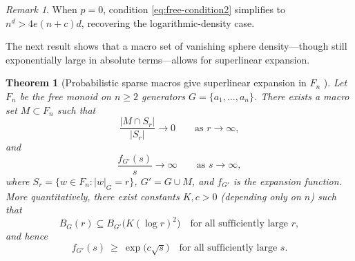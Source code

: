 \documentclass[12pt]{amsart}
\newtheorem{theorem}{Theorem}
\theoremstyle{definition}
\theoremstyle{remark}
\newtheorem{remark}{Remark}
\begin{document}
\begin{remark}
When $p = 0$, condition \eqref{eq:free-condition2} simplifies to $n^d > 4e(n+c)d$, recovering the logarithmic-density case.
\end{remark}

The next result shows that a macro set of vanishing sphere density---though still exponentially large in absolute terms---allows for superlinear expansion.

\begin{theorem}[Probabilistic sparse macros give superlinear expansion in $F_n$ ]
\label{thm:free-probabilistic}
Let $F_n$ be the free monoid on $n\ge 2$ generators $G=\{a_1,\dots,a_n\}$.
There exists a macro set $M\subset F_n$ such that
\[
\frac{|M\cap S_r|}{|S_r|}\longrightarrow 0
\qquad\text{as }r\to\infty,
\]
and
\[
\frac{f_{G'}(s)}{s}\longrightarrow \infty
\qquad\text{as }s\to\infty,
\]
where $S_r=\{w\in F_n:|w|_G=r\}$, $G' = G\cup M$, and $f_{G'}$ is the expansion function.
More quantitatively, there exist constants $K,c>0$ (depending only on $n$) such that
\[
B_G(r)\subseteq B_{G'}\!\bigl(K(\log r)^2\bigr)
\quad\text{for all sufficiently large }r,
\]
and hence
\[
 f_{G'}(s)\ \ge\ \exp\!\bigl(c\sqrt{s}\bigr)
\quad\text{for all sufficiently large }s.
\]
\end{theorem}
\end{document}
